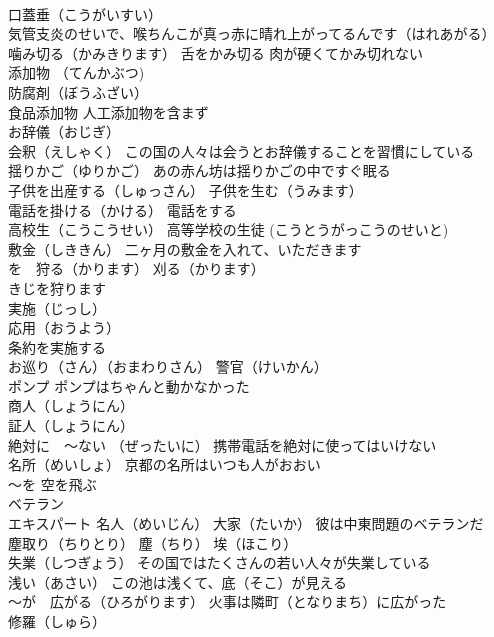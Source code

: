 \documentclass[8pt]{extreport}
\begin{document}
\begin{CJK}{UTF8}{min}
\\	口蓋垂（こうがいすい）
\\	気管支炎のせいで、喉ちんこが真っ赤に晴れ上がってるんです（はれあがる）
\\	噛み切る（かみきります） 舌をかみ切る 肉が硬くてかみ切れない
\\	添加物 （てんかぶつ) 
\\	防腐剤（ぼうふざい）
\\	食品添加物 人工添加物を含まず
\\	お辞儀（おじぎ）
\\	会釈（えしゃく） この国の人々は会うとお辞儀することを習慣にしている
\\	揺りかご（ゆりかご） あの赤ん坊は揺りかごの中ですぐ眠る
\\	子供を出産する（しゅっさん） 子供を生む（うみます）
\\	電話を掛ける（かける） 電話をする
\\	高校生（こうこうせい） 高等学校の生徒 (こうとうがっこうのせいと)
\\	敷金（しききん） 二ヶ月の敷金を入れて、いただきます
\\	を　狩る（かります） 刈る（かります）　
\\	きじを狩ります
\\	実施（じっし）
\\	応用（おうよう）
\\	条約を実施する
\\	お巡り（さん）（おまわりさん） 警官（けいかん）
\\	ポンプ ポンプはちゃんと動かなかった
\\	商人（しょうにん） 
\\	証人（しょうにん）
\\	絶対に　～ない （ぜったいに） 携帯電話を絶対に使ってはいけない
\\	名所（めいしょ） 京都の名所はいつも人がおおい
\\	～を 空を飛ぶ
\\	ベテラン 
\\	エキスパート 名人（めいじん） 大家（たいか） 彼は中東問題のベテランだ
\\	塵取り（ちりとり） 塵（ちり） 埃（ほこり）
\\	失業（しつぎょう） その国ではたくさんの若い人々が失業している
\\	浅い（あさい） この池は浅くて、底（そこ）が見える
\\	～が　広がる（ひろがります） 火事は隣町（となりまち）に広がった
\\	修羅（しゅら）

\end{CJK}
\end{document}
